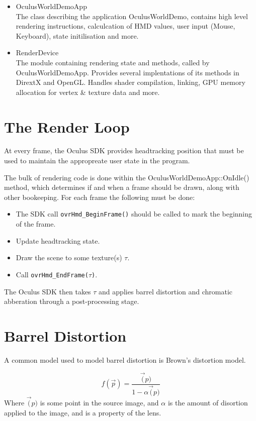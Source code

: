 \documentclass[12pt,a4paper,twoside,openright]{report}
\begin{document}
\begin{itemize}
\item OculusWorldDemoApp \\
  The class describing the application OculusWorldDemo, contains high level rendering instructions, calculcation of HMD values, user input (Mouse, Keyboard), state initilisation and more.

\item RenderDevice \\
  The module containing rendering state and methods, called by OculusWorldDemoApp. Provides several implentations of its methods in DirextX and OpenGL. Handles shader compilation, linking, GPU memory allocation for vertex \& texture data and more.

\end{itemize}
\section{The Render Loop}
At every frame, the Oculus SDK provides headtracking position that must be used to maintain the appropreate user state in the program.

The bulk of rendering code is done within the OculusWorldDemoApp::OnIdle() method, which determines if and when a frame should be drawn, along with other bookeeping.
For each frame the following must be done:

\begin{itemize}
  \item The SDK call \texttt{ovrHmd\_BeginFrame()} should be called to mark the beginning of the frame.
  \item Update headtracking state.
  \item Draw the scene to some texture(s) $\tau$.
  \item Call \texttt{ovrHmd\_EndFrame($\tau$)}.
\end{itemize}

The Oculus SDK then takes $\tau$ and applies barrel distortion and chromatic abberation through a post-processing stage. 

\section{Barrel Distortion}

A common model used to model barrel distortion is Brown's distortion model. 

\[
f(\vec p) = \frac{\vec(p)}{1-\alpha\vec(p)}
\]
Where $\vec(p)$ is some point in the source image, and $\alpha$ is the amount of disortion applied to the image, and is a property of the lens.
\end{document}
